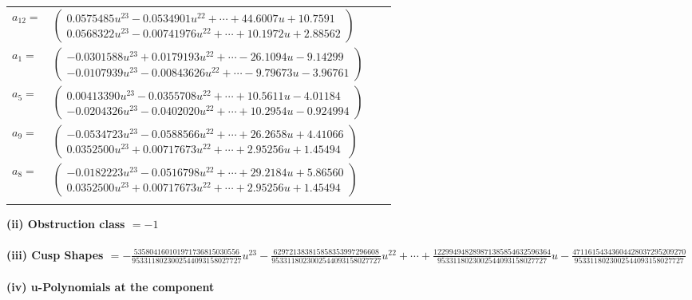 \documentclass[1p]{elsarticle_modified}
\theoremstyle{definition}
\begin{document}
\begin{tabular}{m{7pt} m{180pt} m{7pt} m{180pt} }
\flushright $a_{12}=$&$\begin{pmatrix}0.0575485 u^{23}-0.0534901 u^{22}+\cdots+44.6007 u+10.7591\\0.0568322 u^{23}-0.00741976 u^{22}+\cdots+10.1972 u+2.88562\end{pmatrix}$ \\
\flushright $a_{1}=$&$\begin{pmatrix}-0.0301588 u^{23}+0.0179193 u^{22}+\cdots-26.1094 u-9.14299\\-0.0107939 u^{23}-0.00843626 u^{22}+\cdots-9.79673 u-3.96761\end{pmatrix}$ \\
\flushright $a_{5}=$&$\begin{pmatrix}0.00413390 u^{23}-0.0355708 u^{22}+\cdots+10.5611 u-4.01184\\-0.0204326 u^{23}-0.0402020 u^{22}+\cdots+10.2954 u-0.924994\end{pmatrix}$ \\
\flushright $a_{9}=$&$\begin{pmatrix}-0.0534723 u^{23}-0.0588566 u^{22}+\cdots+26.2658 u+4.41066\\0.0352500 u^{23}+0.00717673 u^{22}+\cdots+2.95256 u+1.45494\end{pmatrix}$ \\
\flushright $a_{8}=$&$\begin{pmatrix}-0.0182223 u^{23}-0.0516798 u^{22}+\cdots+29.2184 u+5.86560\\0.0352500 u^{23}+0.00717673 u^{22}+\cdots+2.95256 u+1.45494\end{pmatrix}$\\&\end{tabular}
\flushleft \textbf{(ii) Obstruction class $= -1$}\\~\\
\flushleft \textbf{(iii) Cusp Shapes $= -\frac{535804160101971736815030556}{9533118023002544093158027727} u^{23}-\frac{629721383815858353997296608}{9533118023002544093158027727} u^{22}+\cdots+\frac{122994948289871385854632596364}{9533118023002544093158027727} u-\frac{47116154343604428037295209270}{9533118023002544093158027727}$}\\~\\
\newpage\renewcommand{\arraystretch}{1}
\flushleft \textbf{(iv) u-Polynomials at the component}\newline \\
\end{document}
